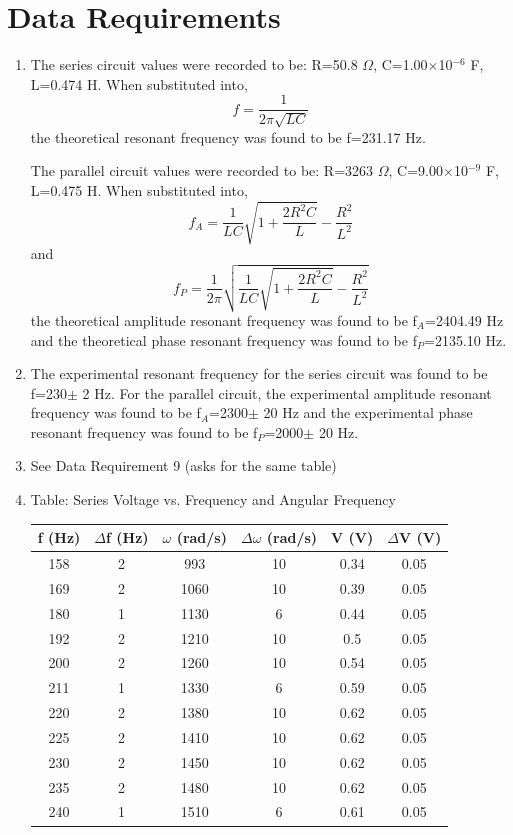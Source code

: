 \documentclass[justified]{tufte-book}
\begin{document}
\section{Data Requirements}
\begin{enumerate}[resume]
\item The series circuit values were recorded to be: R=50.8 $\Omega$, C=1.00$\times$10$^{-6}$ F, L=0.474 H. When substituted into,
$$
f=\frac{1}{2\pi\sqrt{LC}}
$$
the theoretical resonant frequency was found to be f=231.17 Hz.

The parallel circuit values were recorded to be: R=3263 $\Omega$, C=9.00$\times$10$^{-9}$ F, L=0.475 H. When substituted into,
$$
f_A=\frac{1}{LC}\sqrt{1+\frac{2R^2C}{L}}-\frac{R^2}{L^2}
$$
and
$$
f_P=\frac{1}{2\pi}\sqrt{\frac{1}{LC}\sqrt{1+\frac{2R^2C}{L}}-\frac{R^2}{L^2}}
$$
the theoretical amplitude resonant frequency was found to be f$_A$=2404.49 Hz and the theoretical phase resonant frequency was found to be f$_P$=2135.10 Hz.
\item The experimental resonant frequency for the series circuit was found to be f=230$\pm$ 2 Hz. For the parallel circuit, the experimental amplitude resonant frequency was found to be f$_A$=2300$\pm$ 20 Hz and the experimental phase resonant frequency was found to be f$_P$=2000$\pm$ 20 Hz.
\item See Data Requirement 9 (asks for the same table)
\newpage
\item Table: Series Voltage vs. Frequency and Angular Frequency
\begin{table}[H]
\center
\begin{tabular}{|c|c|c|c|c|c|}
\hline
f (Hz) & $\Delta$f (Hz) & $\omega$ (rad/s) & $\Delta\omega$ (rad/s) & V (V) & $\Delta$V (V)\\
\hline
158 & 2 & 993  & 10 & 0.34 & 0.05\\
169 & 2 & 1060 & 10 & 0.39 & 0.05\\
180 & 1 & 1130 & 6  & 0.44 & 0.05\\
192 & 2 & 1210 & 10 & 0.5  & 0.05\\
200 & 2 & 1260 & 10 & 0.54 & 0.05\\
211 & 1 & 1330 & 6  & 0.59 & 0.05\\
220 & 2 & 1380 & 10 & 0.62 & 0.05\\
225 & 2 & 1410 & 10 & 0.62 & 0.05\\
230 & 2 & 1450 & 10 & 0.62 & 0.05\\
235 & 2 & 1480 & 10 & 0.62 & 0.05\\
240 & 1 & 1510 & 6  & 0.61 & 0.05\\

\end{tabular}
\end{table}
\end{enumerate}
\end{document}
